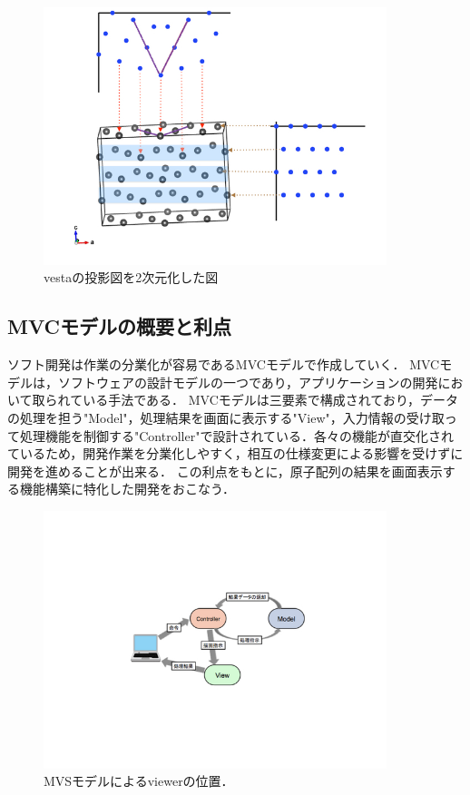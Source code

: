 \begin{figure}[htbp]\begin{center}
\includegraphics[width=10cm,bb= 0 0 737 553]{../figs/./boundary_narita.007.jpeg}
\caption{vestaの投影図を2次元化した図}
\label{default}\end{center}\end{figure}
\subsection{MVCモデルの概要と利点}
ソフト開発は作業の分業化が容易であるMVCモデルで作成していく．
MVCモデルは，ソフトウェアの設計モデルの一つであり，アプリケーションの開発において取られている手法である．
MVCモデルは三要素で構成されており，データの処理を担う"Model"，処理結果を画面に表示する"View"，入力情報の受け取って処理機能を制御する"Controller"で設計されている．各々の機能が直交化されているため，開発作業を分業化しやすく，相互の仕様変更による影響を受けずに開発を進めることが出来る\cite{mvc}．
この利点をもとに，原子配列の結果を画面表示する機能構築に特化した開発をおこなう．

\begin{figure}[htbp]\begin{center}
\includegraphics[width=10cm,bb= 0 0 737 553]{../figs/./boundary_narita.005.jpeg}
\caption{MVSモデルによるviewerの位置．}
\label{default}\end{center}\end{figure}

